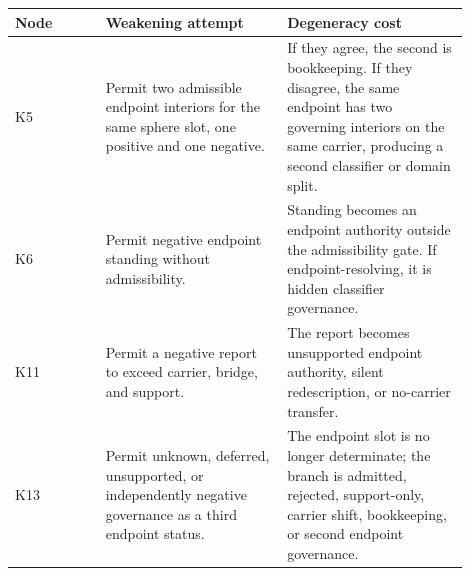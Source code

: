 \documentclass[11pt]{article}
\begin{document}
\begin{longtable}{L{0.18\linewidth}L{0.36\linewidth}L{0.36\linewidth}}
\toprule
\textbf{Node} & \textbf{Weakening attempt} & \textbf{Degeneracy cost}\\
\midrule
K5 & Permit two admissible endpoint interiors for the same sphere slot, one positive and one negative. & If they agree, the second is bookkeeping. If they disagree, the same endpoint has two governing interiors on the same carrier, producing a second classifier or domain split.\\
K6 & Permit negative endpoint standing without admissibility. & Standing becomes an endpoint authority outside the admissibility gate. If endpoint-resolving, it is hidden classifier governance.\\
K11 & Permit a negative report to exceed carrier, bridge, and support. & The report becomes unsupported endpoint authority, silent redescription, or no-carrier transfer.\\
K13 & Permit unknown, deferred, unsupported, or independently negative governance as a third endpoint status. & The endpoint slot is no longer determinate; the branch is admitted, rejected, support-only, carrier shift, bookkeeping, or second endpoint governance.\\
\bottomrule
\end{longtable}
\end{document}
